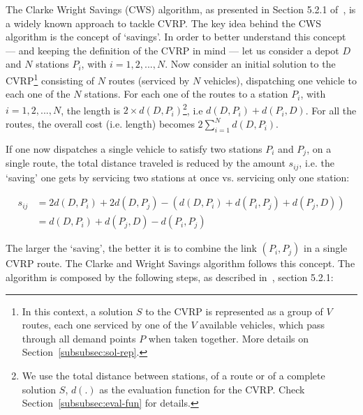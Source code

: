 The Clarke Wright 
Savings (CWS) algorithm, as presented in Section 5.2.1 of~\cite{Toth2002}, 
is a widely known approach to tackle CVRP. The 
key idea behind the CWS algorithm is the concept of `savings'. In order to 
better understand this concept --- and keeping the definition of the 
CVRP in mind --- let us consider a depot $D$ and $N$ stations $P_i$, with $i = 1, 2, ..., N$. Now consider an 
initial solution to the CVRP\footnote{In this context, a solution $S$ to the CVRP is represented as a group of $V$ routes, each one serviced by one of the $V$ available vehicles, which pass through all demand points $P$ when taken together. More details on Section~\ref{subsubsec:sol-rep}.} consisting of $N$ routes (serviced by $N$ vehicles), 
dispatching one vehicle to each one of the $N$ stations. For each one of 
the routes to a station $P_i$, with $i = 1, 2, ..., N$, the length is 
$2 \times d(D,P_i)$\footnote{We use the total distance between stations, of 
a route or of a complete solution $S$, $d(.)$ as the evaluation function for the 
CVRP. Check Section~\ref{subsubsec:eval-fun} for details.}, i.e $d(D,P_i) + d(P_i,D)$. For all the routes, the overall cost (i.e. 
length) becomes $2\sum_{i=1}^{N} d(D,P_i)$.\vertbreak

If one now dispatches a single vehicle to satisfy two stations $P_i$ and $P_j$, on a 
single route, the total distance traveled is reduced by the amount $s_{ij}$, i.e. 
the `saving' one gets by servicing two stations at once vs. servicing only 
one station:

\begin{equation*}
\begin{split}
s_{ij}  &= 2d(D,P_i) + 2d(D,P_j) - (d(D,P_i) + d(P_i,P_j) + d(P_j,D))\\
        &= d(D,P_i) + d(P_j,D) - d(P_i,P_j)
\end{split}
\end{equation*}\vertbreak

The larger the `saving', the better it is to combine the link $(P_i,P_j)$ in a single 
CVRP route. The Clarke and Wright Savings algorithm follows this concept. The 
algorithm is composed by the following steps, as described in~\cite{Toth2002}, 
section 5.2.1:

